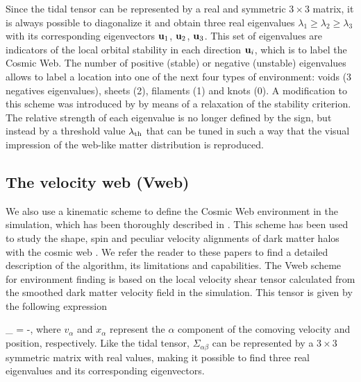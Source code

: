 \documentclass[a4,useAMS,usenatbib,usegraphicx]{latex/mn2e}
\begin{document}
Since the tidal tensor can be represented by a real and  symmetric
$3\times 3$ matrix, it is always possible to diagonalize  
it and obtain three real eigenvalues $\lambda_{1}\geq\lambda_{2}\geq
\lambda_3$ with its corresponding eigenvectors ${\bf u}_{1}$, ${\bf u}_{2}$,
${\bf u}_{3}$. 
This set of eigenvalues are indicators of the local  orbital stability
in each direction ${\bf u}_i$, which is to label the Cosmic Web.
The number of positive (stable) or negative (unstable) eigenvalues allows 
to label a location into one of the next four types of environment: 
voids (3 negatives eigenvalues), sheets (2), filaments (1) and knots (0). 
A modification to this scheme was introduced by \citet{Forero09}
by means of a relaxation of the stability criterion. The relative strength 
of each eigenvalue is no longer defined by the sign, but instead by a
threshold value $\lambda_{\rm th}$ that can be tuned in such a way
that the visual impression of the web-like matter distribution is
reproduced. 
 
\subsection{The velocity web (Vweb)}
\label{subsec:Vweb}


We also use a kinematic scheme to define the Cosmic Web environment in 
the simulation, which has been thoroughly described in 
\cite{Hoffman12}.
This scheme has been used to study the shape, spin and peculiar
velocity alignments of dark matter halos with the cosmic web
\citep{Libeskind13,Forero2014}. 
We refer the reader to these papers to find a detailed description of
the algorithm, its limitations  and capabilities.    
The Vweb scheme for environment finding is based on the
local velocity shear tensor calculated from the smoothed dark matter 
velocity field in the simulation. This tensor is given by the 
following expression

{	\Sigma_{\alpha\beta} = -,}
where $v_{\alpha}$ and $x_{\alpha}$ represent the $\alpha$ component of 
the comoving velocity and position, respectively. Like the tidal tensor, 
$\Sigma_{\alpha\beta}$ can be represented by a $3\times 3$ symmetric 
matrix with real values, making it possible to find three real
eigenvalues and its corresponding eigenvectors.
\end{document}

